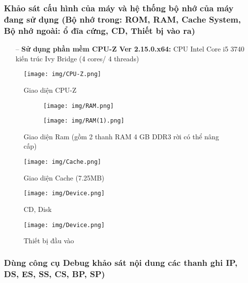 \documentclass{article}
\begin{document}
\subsubsection{Khảo sát cấu hình của máy và hệ thống bộ nhớ của máy đang sử dụng (Bộ nhớ trong: ROM, RAM, Cache System, Bộ nhớ ngoài: ổ đĩa cứng, CD, Thiết bị vào ra)}

 \begin{itemize}
    \item[--]\textbf{Sử dụng phần mềm CPU-Z Ver 2.15.0.x64:} CPU Intel Core i5 3740 kiến trúc Ivy Bridge (4 cores/ 4 threads)
\end{itemize}

\begin{figure}[H]
    \centering
    \texttt{[image: img/CPU-Z.png]}
    \caption{Giao diện CPU-Z}
    \label{fig:before_input}
\end{figure}

\begin{figure}[H]
    \centering
    \begin{subfigure}[b]{0.7\textwidth}
        \centering
        \texttt{[image: img/RAM.png]}
    \end{subfigure}
    \hfill
    \begin{subfigure}[b]{0.7\textwidth}
        \centering
        \texttt{[image: img/RAM(1).png]}
    \end{subfigure}
    \caption{Giao diện Ram (gồm 2 thanh RAM 4 GB DDR3 rời có thể nâng cấp)}
    \label{fig:before_input}
\end{figure}

\begin{figure}[H]
    \centering
    \texttt{[image: img/Cache.png]}
    \caption{Giao diện Cache (7.25MB)}
    \label{fig:before_input}
\end{figure}

\begin{figure}[H]
    \centering
    \texttt{[image: img/Device.png]}
    \caption{CD, Disk}
    \label{fig:before_input}
\end{figure}

\begin{figure}[H]
    \centering
    \texttt{[image: img/Device.png]}
    \caption{Thiết bị đầu vào}
    \label{fig:before_input}
\end{figure}


\subsubsection{Dùng công cụ Debug khảo sát nội dung các thanh ghi IP, DS, ES, SS, CS, BP, SP)}
\end{document}

